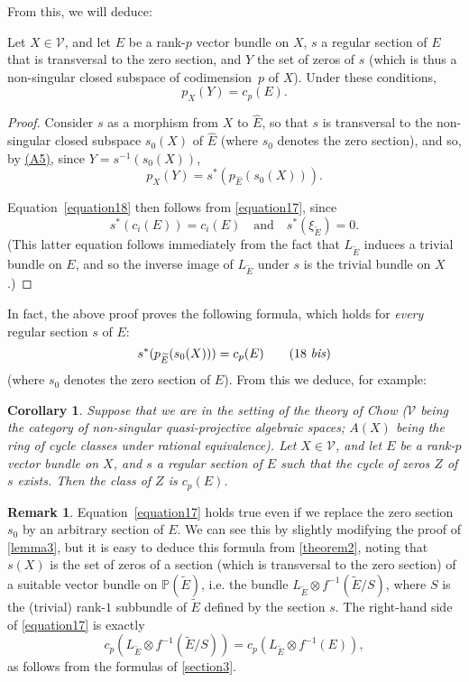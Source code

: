 \documentclass{article}
\theoremstyle{plain}
\newenvironment{theorem}[1]
    {\renewcommand\theinnercustomtheorem{#1}\innercustomtheorem}
    {\endinnercustomtheorem}
\newtheorem*{corollary}{Corollary}
\theoremstyle{definition}
\newtheorem*{remark}{Remark}
\newcommand{\cat}[1]{{\mathcal{#1}}}
\newcommand{\oldpage}[1]{\marginpar{\footnotesize$\Big\vert$ \textit{p.~#1}}}
\begin{document}
From this, we will deduce:

\begin{theorem}{2}
\label{theorem2}
  Let $X\in\cat{V}$, and let $E$ be a rank-$p$ vector bundle on $X$, $s$ a regular section of $E$ that is transversal to the zero section, and $Y$ the set of zeros of $s$ (which is thus a non-singular closed subspace of codimension~$p$ of $X$).
  Under these conditions,
  \[
  \label{equation18}
    p_X(Y) = c_p(E).
  \tag{18}
  \] 
\end{theorem}

\begin{proof}
  Consider $s$ as a morphism from $X$ to $\widehat{E}$, so that $s$ is transversal to the non-singular closed subspace $s_0(X)$ of $\widehat{E}$ (where $s_0$ denotes the zero section), and so, by \hyperref[axiomA5]{(A5)}, since $Y=s^{-1}(s_0(X))$,
  \[
    p_X(Y) = s^*(p_{\widehat{E}}(s_0(X))).
  \]

  Equation~\cref{equation18} then follows from \cref{equation17}, since
  \[
    s^*(c_i(E)) = c_i(E)
    \quad\text{and}\quad
    s^*(\xi_{\widetilde{E}}) = 0.
  \]
  (This latter equation follows immediately from the fact that $L_{\widetilde{E}}$ induces a trivial bundle on $E$, and so the inverse image of $L_{\widetilde{E}}$ under $s$ is the trivial bundle on $X$.)
\end{proof}

In fact, the above proof proves the following formula, which holds for \emph{every} regular section $s$ of $E$:
\[
\label{equation18bis}
  s^*(p_{\widetilde{E}}(s_0(X))) = c_p(E)
\tag{18 \emph{bis}}
\]
(where $s_0$ denotes the zero section of $E$).
From this we deduce, for example:

\begin{corollary}
  Suppose that we are in the setting of the theory of Chow ($\cat{V}$ being the category of non-singular quasi-projective algebraic spaces; $A(X)$ being the ring of cycle classes under rational equivalence).
  Let $X\in\cat{V}$, and let $E$ be a rank-$p$ vector bundle on $X$, and $s$ a regular section of $E$ such that the cycle of zeros $Z$ of $s$ exists.
  Then the class of $Z$ is $c_p(E)$.
\end{corollary}

\begin{remark}
  Equation~\cref{equation17} holds true even if we replace the zero section $s_0$ by an arbitrary section of $E$.
  We can see this by slightly modifying the proof of \cref{lemma3}, but it is easy to deduce this formula from
\oldpage{154}
  \cref{theorem2}, noting that $s(X)$ is the set of zeros of a section (which is transversal to the zero section) of a suitable vector bundle on $\mathbb{P}(\widetilde{E})$, i.e. the bundle $L_{\widetilde{E}}\otimes f^{-1}(\widetilde{E}/S)$, where $S$ is the (trivial) rank-$1$ subbundle of $\widetilde{E}$ defined by the section $s$.
  The right-hand side of \cref{equation17} is exactly
  \[
    c_p(L_{\widetilde{E}}\otimes f^{-1}(\widetilde{E}/S)) = c_p(L_{\widetilde{E}}\otimes f^{-1}(E)),
  \]
  as follows from the formulas of \cref{section3}.
\end{remark}
\end{document}
